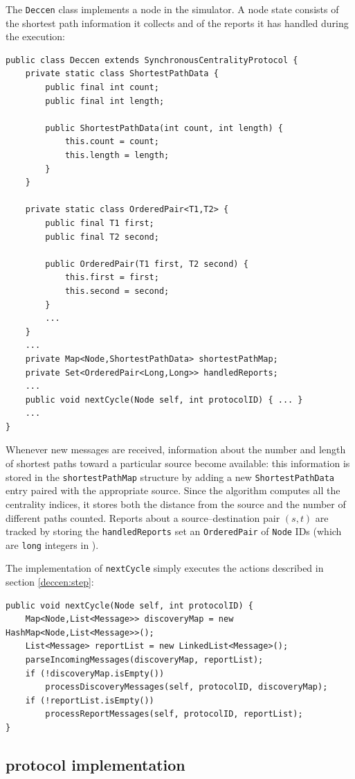 The \texttt{Deccen} class implements a \deccen{} node in the simulator. A node state consists of the shortest path information it collects and of the reports it has handled during the execution:
\begin{verbatim}
public class Deccen extends SynchronousCentralityProtocol {
    private static class ShortestPathData {
        public final int count;
        public final int length;

        public ShortestPathData(int count, int length) {
            this.count = count;
            this.length = length;
        }
    }

    private static class OrderedPair<T1,T2> {
        public final T1 first;
        public final T2 second;

        public OrderedPair(T1 first, T2 second) {
            this.first = first;
            this.second = second;
        }
        ...
    }
    ...
    private Map<Node,ShortestPathData> shortestPathMap;
    private Set<OrderedPair<Long,Long>> handledReports;
    ...
    public void nextCycle(Node self, int protocolID) { ... }
    ...
}
\end{verbatim}
Whenever new \mdisc{} messages are received, information about the number and length of shortest paths toward a particular source become available: this information is stored in the \texttt{shortestPathMap} structure by adding a new \texttt{ShortestPathData} entry paired with the appropriate source. Since the algorithm computes all the centrality indices, it stores both the distance from the source and the number of different paths counted. Reports about a source--destination pair $(s,t)$ are tracked by storing the \texttt{handledReports} set an \texttt{OrderedPair} of \texttt{Node} IDs (which are \texttt{long} integers in \peersim{}).

The implementation of \texttt{nextCycle} simply executes the actions described in section \ref{deccen:step}:
\begin{verbatim}
public void nextCycle(Node self, int protocolID) {
    Map<Node,List<Message>> discoveryMap = new HashMap<Node,List<Message>>();
    List<Message> reportList = new LinkedList<Message>();
    parseIncomingMessages(discoveryMap, reportList);
    if (!discoveryMap.isEmpty())
        processDiscoveryMessages(self, protocolID, discoveryMap);
    if (!reportList.isEmpty())
        processReportMessages(self, protocolID, reportList);
}
\end{verbatim}

\subsection{\multibfs{} protocol implementation}

